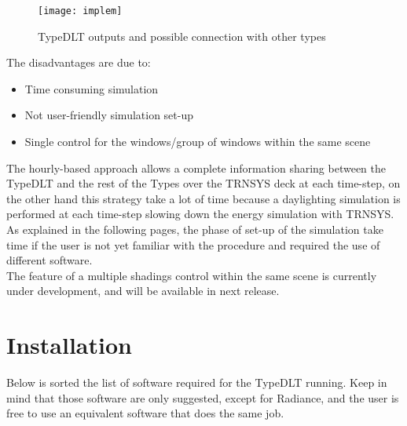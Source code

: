 \begin{figure}[h]
\centering
\texttt{[image: implem]}
\caption{\label{img2:implem} TypeDLT outputs and possible connection with other types}
\end{figure}

The disadvantages are due to:
\begin{itemize}
\renewcommand{\labelitemi}{\tiny$\blacksquare$}
\item Time consuming simulation
\item Not user-friendly simulation set-up
\item Single control for the windows/group of windows within the same scene
\end{itemize}

The hourly-based approach allows a complete information sharing between the TypeDLT and the rest of the Types over the TRNSYS deck at each time-step, on the other hand this strategy take a lot of time because a daylighting simulation is performed at each time-step slowing down the energy simulation with TRNSYS.\\
As explained in the following pages, the phase of set-up of the simulation take time if the user is not yet familiar with the procedure and required the use of different software.\\
The feature of a multiple shadings control within the same scene is currently under development, and will be available in next release.

\section{Installation}
Below is sorted the list of software required for the TypeDLT running. Keep in mind that those software are only suggested, except for Radiance, and the user is free to use an equivalent software that does the same job.

